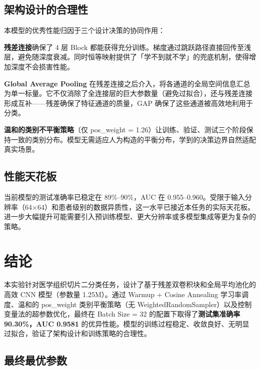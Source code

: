 \documentclass[12pt,a4paper]{ctexart}
\begin{document}
\subsection{架构设计的合理性}

本模型的优秀性能归因于三个设计决策的协同作用：

\textbf{残差连接}确保了 4 层 Block 都能获得充分训练。梯度通过跳跃路径直接回传至浅层，避免随深度衰减。同时恒等映射提供了「学不到就不学」的兜底机制，使得增加深度不会损害性能。

\textbf{Global Average Pooling} 在残差连接之后介入，将各通道的全局空间信息汇总为单一标量。它不仅消除了全连接层的巨大参数量（避免过拟合），还与残差连接形成互补——残差确保了特征通道的质量，GAP 确保了这些通道被高效地利用于分类。

\textbf{温和的类别不平衡策略}（仅 pos\_weight = 1.26）让训练、验证、测试三个阶段保持一致的类别分布。模型无需适应人为构造的平衡分布，学到的决策边界自然适配真实场景。

\subsection{性能天花板}

当前模型的测试准确率已稳定在 89\%--90\%，AUC 在 0.955--0.960。受限于输入分辨率（64$\times$64）和患者级别的数据异质性，这一水平已接近本任务的实际天花板。进一步大幅提升可能需要引入预训练模型、更大分辨率或多模型集成等更为复杂的策略。

\section{结论}

本实验针对医学组织切片二分类任务，设计了基于残差双卷积块和全局平均池化的高效 CNN 模型（参数量 1.25M）。通过 Warmup + Cosine Annealing 学习率调度、温和的 pos\_weight 类别平衡策略（无 WeightedRandomSampler）以及控制变量法的超参数优化，最终在 Batch Size = 32 的配置下取得了\textbf{测试集准确率 90.30\%，AUC 0.9581} 的优异性能。模型的训练过程稳定、收敛良好、无明显过拟合，验证了架构设计和训练策略的合理性。

\subsection*{最终最优参数}
\end{document}
